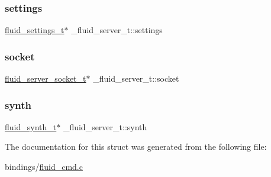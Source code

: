 \subsubsection{\texorpdfstring{settings}{settings}}
{\footnotesize\ttfamily \hyperlink{types_8h_aa363402d3c77333b0f070ba531d034ba}{fluid\+\_\+settings\+\_\+t}$\ast$ \+\_\+fluid\+\_\+server\+\_\+t\+::settings}

\mbox{\label{struct__fluid__server__t_a738603070c2e5b4fc0e99e0a1471715a}} 
\subsubsection{\texorpdfstring{socket}{socket}}
{\footnotesize\ttfamily \hyperlink{fluidsynth__priv_8h_a1b3924046f25f0f93876aeb093b613b9}{fluid\+\_\+server\+\_\+socket\+\_\+t}$\ast$ \+\_\+fluid\+\_\+server\+\_\+t\+::socket}

\mbox{\label{struct__fluid__server__t_ac67b75b1c51efea21e5ce8450e9872f6}} 
\subsubsection{\texorpdfstring{synth}{synth}}
{\footnotesize\ttfamily \hyperlink{types_8h_ae265f10ae174a13afe010de50d87e1a4}{fluid\+\_\+synth\+\_\+t}$\ast$ \+\_\+fluid\+\_\+server\+\_\+t\+::synth}



The documentation for this struct was generated from the following file\+:\begin{DoxyCompactItemize}
\item 
bindings/\hyperlink{fluid__cmd_8c}{fluid\+\_\+cmd.\+c}\end{DoxyCompactItemize}
